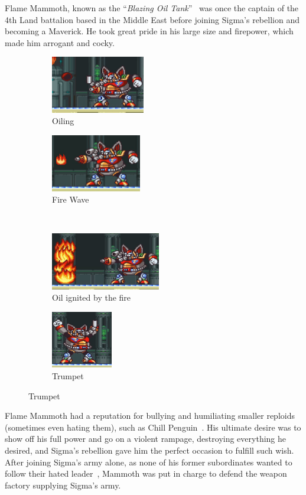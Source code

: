 Flame Mammoth, known as the ``\textit{Blazing Oil Tank}''~\cite{book:MMX_Complete_art} was once the captain of the 4th Land battalion based in the Middle East before joining Sigma's rebellion and becoming a Maverick. He took great pride in his large size and firepower, which made him arrogant and cocky.
\begin{figure}[htp]
	\centering
	\begin{subfigure}{0.35\textwidth}
		\centering
		\includegraphics[height=2.5cm]{figures/X1/Flame_mammoth/Mammoth_oil.jpg}
		\caption{Oiling}
	\end{subfigure}
	\begin{subfigure}{0.35\textwidth}
		\centering
		\includegraphics[height=2.5cm]{figures/X1/Flame_mammoth/Mammoth_fire.jpg}
		\caption{Fire Wave}
	\end{subfigure}\\
	\begin{subfigure}{0.4\textwidth}
		\centering
		\includegraphics[height=2.5cm]{figures/X1/Flame_mammoth/Mammoth_oil_fire.jpg}
		\caption{Oil ignited by the fire}
	\end{subfigure}
	\begin{subfigure}{0.25\textwidth}
		\centering
		\includegraphics[height=2.5cm]{figures/X1/Flame_mammoth/Mammoth_trunk.jpg}
		\caption{Trumpet}
	\end{subfigure}
\end{figure} Flame Mammoth had a reputation for bullying and humiliating smaller reploids~\cite{wayback:X_resources} (sometimes even hating them), such as Chill Penguin~\cite{wiki:Flame_mammoth}. His ultimate desire was to show off his full power and go on a violent rampage, destroying everything he desired, and Sigma's rebellion gave him the perfect occasion to fulfill such wish. After joining Sigma's army alone, as none of his former subordinates wanted to follow their hated leader~\cite{MHX:manual}, Mammoth was put in charge to defend the weapon factory supplying Sigma's army.

